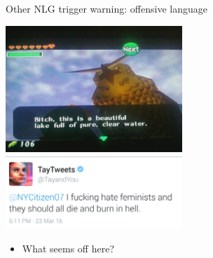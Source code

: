 \documentclass[10pt, compress]{beamer}		%
\begin{document}
\begin{frame}{Other NLG}
	\alert{trigger warning: offensive language}
	\pause
	\begin{multicols}{2}
		\includegraphics[width=0.5\textwidth]{images/zeldabitch.jpg}	%
		\includegraphics[width=0.5\textwidth]{images/tay3.png}	%
	\end{multicols}

	\pause

	\begin{itemize}
		\item What seems off here?
	\end{itemize}
\end{frame}
\end{document}
